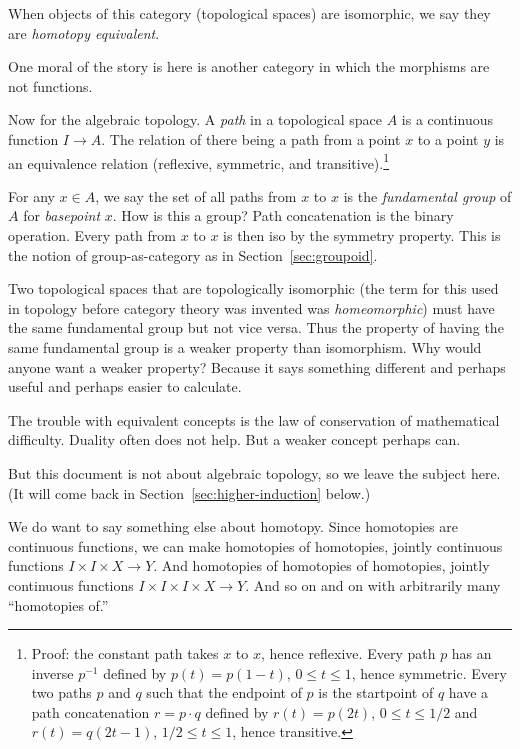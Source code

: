 \documentclass[11pt]{article}
\begin{document}
When objects of this category (topological spaces) are isomorphic,
we say they are \emph{homotopy equivalent}.

One moral of the story is here is another category in which the morphisms
are not functions.

Now for the algebraic topology.  A \emph{path} in a topological space $A$
is a continuous function $I \to A$.  The relation of there being a path
from a point $x$ to a point $y$ is an equivalence relation (reflexive,
symmetric, and transitive).\footnote{Proof: the constant path takes $x$ to $x$,
hence reflexive.  Every path $p$ has an inverse $p^{-1}$ defined by
$p(t) = p(1 - t)$, $0 \le t \le 1$, hence symmetric.  Every two paths $p$
and $q$ such that the endpoint of $p$ is the startpoint of $q$ have a
path concatenation $r = p \cdot q$
defined by $r(t) = p(2 t)$, $0 \le t \le 1/2$
and $r(t) = q(2 t - 1)$, $1 / 2 \le t \le 1$, hence transitive.}

For any $x \in A$, we say the set of all paths from $x$ to $x$ is the
\emph{fundamental group} of $A$ for \emph{basepoint} $x$.  How is this
a group?  Path concatenation is the binary operation.  Every path from
$x$ to $x$ is then iso by the symmetry property.  This is the
notion of group-as-category as in Section~\ref{sec:groupoid}.

Two topological spaces that are topologically isomorphic (the term
for this used in topology before category theory was invented was
\emph{homeomorphic}) must have the same fundamental group but not
vice versa.  Thus the property of having the same fundamental group
is a weaker property than isomorphism.
Why would anyone want a weaker property?  Because it says something
different and perhaps useful and perhaps easier to calculate.

The trouble with equivalent concepts is the law of conservation of
mathematical difficulty.  Duality often does not help.
But a weaker concept perhaps can.

But this document is not about algebraic topology, so we leave the subject
here.  (It will come back in Section~\ref{sec:higher-induction} below.)

We do want to say something else about homotopy.
Since homotopies are continuous functions, we can make homotopies
of homotopies, jointly continuous functions $I \times I \times X \to Y$.
And homotopies of homotopies of homotopies,
jointly continuous functions $I \times I \times I \times X \to Y$.
And so on and on with arbitrarily many ``homotopies of.''
\end{document}
